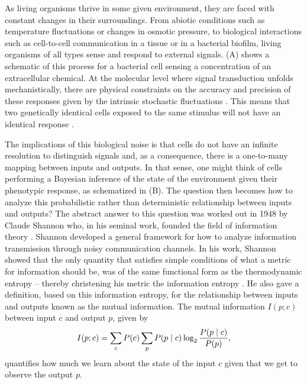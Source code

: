 As living organisms thrive in some given environment, they are faced with
constant changes in their surroundings. From abiotic conditions such as
temperature fluctuations or changes in osmotic pressure, to biological
interactions such as cell-to-cell communication in a tissue or in a bacterial
biofilm, living organisms of all types sense and respond to external signals.
(A) shows a schematic of this process for a bacterial cell
sensing a concentration of an extracellular chemical. At the molecular level
where signal transduction unfolds mechanistically, there are physical
constraints on the accuracy and precision of these responses given by the
intrinsic stochastic fluctuations \cite{Nemenman2010}. This means that two
genetically identical cells exposed to the same stimulus will not have an
identical response \cite{Eldar2010}.

The implications of this biological noise is that cells do not have an infinite
resolution to distinguish signals and, as a consequence, there is a one-to-many
mapping between inputs and outputs. In that sense, one might think of cells
performing a Bayesian inference of the state of the environment given their
phenotypic response, as schematized in (B). The question then
becomes how to analyze this probabilistic rather than deterministic relationship
between inputs and outputs? The abstract answer to this question was worked out
in 1948 by Claude Shannon who, in his seminal work, founded the field of
information theory \cite{Shannon1948}. Shannon developed a general framework for
how to analyze information transmission through noisy communication channels. In
his work, Shannon showed that the only quantity that satisfies simple conditions
of what a metric for information should be, was of the same functional form as
the thermodynamic entropy -- thereby christening his metric the information
entropy \cite{MacKay2003}. He also gave a definition, based on this information
entropy, for the relationship between inputs and outputs known as the mutual
information. The mutual information $I(p; c)$ between input $c$ and output $p$,
given by
\begin{equation}
  I(p; c) = \sum_c P(c) \sum_p P(p \mid c) \log_2 {P(p \mid c) \over P(p)},
	\label{eq_mutual_info}
\end{equation}
quantifies how much we learn about the state of the input $c$ given that we get
to observe the output $p$.

